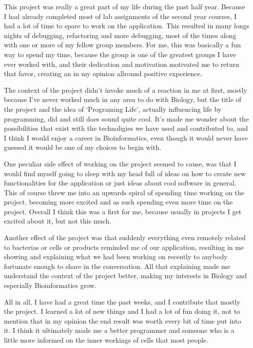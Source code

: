 	This project was really a great part of my life during the past half year. Because I had already completed most of lab assignments of the second year courses, I had a lot of time to spare to work on the application. This resulted in many longs nights of debugging, refactoring and more debugging, most of the times along with one or more of my fellow group members. For me, this was basically a fun way to spend my time, because the group is one of the greatest groups I have ever worked with, and their dedication and motivation motivated me to return that favor, creating an in my opinion allround positive experience.

	The context of the project didn't invoke much of a reaction in me at first, mostly because I've never worked much in any area to do with Biology, but the title of the project and the idea of `Programing Life', actually influencing life by programming, did and still does sound quite cool. It's made me wonder about the possibilities that exist with the technoligies we have used and contributed to, and I think I would enjoy a career in Bioinformatics, even though it would never have guessed it would be one of my choices to begin with.

	One peculiar side effect of working on the project seemed to cause, was that I would find myself going to sleep with my head full of ideas on how to create new functionalities for the application or just ideas about cool software in general. This of course threw me into an upwards spiral of spending time working on the project, becoming more excited and as such spending even more time on the project. Overall I think this was a first for me, because usually in projects I get excited about it, but not this much.

	Another effect of the project was that suddenly everything even remotely related to bacterias or cells or products reminded me of our application, resulting in me showing and explaining what we had been working on recently to anybody fortunate enough to share in the conversation. All that explaining made me understand the context of the project better, making my interests in Biology and especially Bioinformatics grow.

	All in all, I have had a great time the past weeks, and I contribute that mostly the project. I learned a lot of new things and I had a lot of fun doing it, not to mention that in my opinion the end result was worth every bit of time put into it. I think it ultimately made me a better programmer and someone who is a little more informed on the inner workings of cells that most people.
